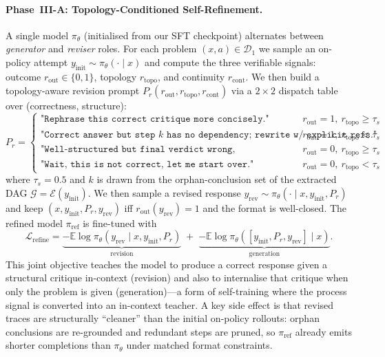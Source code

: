 \paragraph{Phase~III-A: Topology-Conditioned Self-Refinement.}
A single model $\pi_\theta$ (initialised from our SFT checkpoint) alternates
between \emph{generator} and \emph{reviser} roles. For each problem
$(x,a)\in\mathcal{D}_1$ we sample an on-policy attempt
$y_{\mathrm{init}}\!\sim\!\pi_\theta(\cdot\mid x)$ and compute the three
verifiable signals: outcome $r_{\mathrm{out}}\!\in\!\{0,1\}$, topology
$r_{\mathrm{topo}}$, and continuity $r_{\mathrm{cont}}$. We then build a
topology-aware revision prompt $P_r(r_{\mathrm{out}},r_{\mathrm{topo}},r_{\mathrm{cont}})$
via a $2\!\times\!2$ dispatch table over (correctness, structure):
\begin{equation}
\label{eq:topo_pr}
P_r =
\begin{cases}
\texttt{"Rephrase this correct critique more concisely."}
  & r_{\mathrm{out}}{=}1,\ r_{\mathrm{topo}}{\ge}\tau_s \\
\texttt{"Correct answer but step $k$ has no dependency; rewrite w/ explicit refs."}
  & r_{\mathrm{out}}{=}1,\ r_{\mathrm{topo}}{<}\tau_s \\
\texttt{"Well-structured but final verdict wrong, reconsider."}
  & r_{\mathrm{out}}{=}0,\ r_{\mathrm{topo}}{\ge}\tau_s \\
\texttt{"Wait, this is not correct, let me start over."}
  & r_{\mathrm{out}}{=}0,\ r_{\mathrm{topo}}{<}\tau_s
\end{cases}
\end{equation}
where $\tau_s=0.5$ and $k$ is drawn from the orphan-conclusion set of the
extracted DAG $\mathcal{G}=\mathcal{E}(y_{\mathrm{init}})$. We then sample a
revised response
$y_{\mathrm{rev}}\!\sim\!\pi_\theta(\cdot\mid x,y_{\mathrm{init}},P_r)$ and
keep $(x,y_{\mathrm{init}},P_r,y_{\mathrm{rev}})$ iff
$r_{\mathrm{out}}(y_{\mathrm{rev}})=1$ and the format is well-closed.
The refined model $\pi_{\mathrm{ref}}$ is fine-tuned with
\begin{equation}
\label{eq:srt}
\mathcal{L}_{\mathrm{refine}} =
\underbrace{-\mathbb{E}\log\pi_\theta(y_{\mathrm{rev}}\mid x,y_{\mathrm{init}},P_r)}_{\text{revision}}
\;+\;
\underbrace{-\mathbb{E}\log\pi_\theta([y_{\mathrm{init}},P_r,y_{\mathrm{rev}}]\mid x)}_{\text{generation}}.
\end{equation}
This joint objective teaches the model to produce a correct response given a
structural critique in-context (revision) and also to internalise that
critique when only the problem is given (generation)---a form of self-training
where the process signal is converted into an in-context teacher. A key
side effect is that revised traces are structurally ``cleaner'' than the
initial on-policy rollouts: orphan conclusions are re-grounded and redundant
steps are pruned, so $\pi_{\mathrm{ref}}$ already emits shorter completions
than $\pi_\theta$ under matched format constraints.

